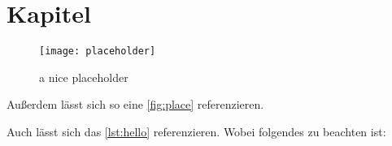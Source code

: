 \section{Kapitel}\label{sec:kaptiel}

\blindtext

\begin{figure}[h]
    \centering
    \texttt{[image: placeholder]}
    \caption{a nice placeholder}
    \label{fig:place}
\end{figure}

\blindtext
Außerdem lässt sich so eine \autoref{fig:place} referenzieren\cite{dreyfus:1980}.




Auch lässt sich das \autoref{lst:hello} referenzieren.
Wobei folgendes zu beachten ist:
\blindtext

